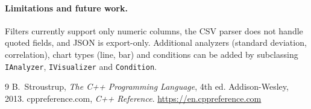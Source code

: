 \documentclass[11pt,a4paper]{article}
\newcommand{\code}[1]{\texttt{#1}}
\begin{document}
\paragraph{Limitations and future work.} Filters currently support only numeric columns, the CSV
parser does not handle quoted fields, and JSON is export-only. Additional analyzers (standard
deviation, correlation), chart types (line, bar) and conditions can be added by subclassing
\code{IAnalyzer}, \code{IVisualizer} and \code{Condition}.

\begin{thebibliography}{9}
 B.~Stroustrup, \emph{The C++ Programming Language}, 4th ed. Addison-Wesley, 2013.
 cppreference.com, \emph{C++ Reference}. \url{https://en.cppreference.com}
\end{thebibliography}
\end{document}
